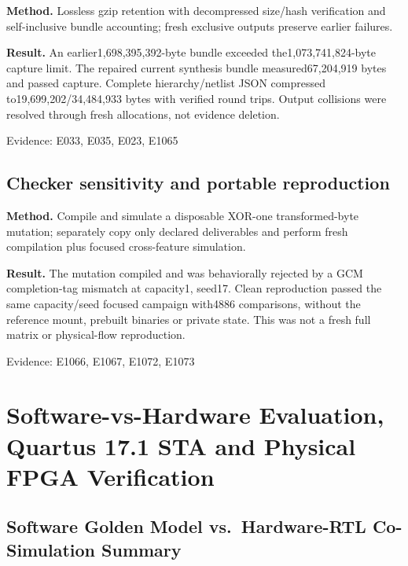 \documentclass[11pt,a4paper]{article}
\begin{document}
\textbf{Method.} Lossless gzip retention with decompressed size/\allowbreak{}hash verification and self-inclusive bundle accounting; fresh exclusive outputs preserve earlier failures.

\textbf{Result.} An earlier1,\allowbreak{}698,\allowbreak{}395,\allowbreak{}392-byte bundle exceeded the1,\allowbreak{}073,\allowbreak{}741,\allowbreak{}824-byte capture limit. The repaired current synthesis bundle measured67,\allowbreak{}204,\allowbreak{}919 bytes and passed capture. Complete hierarchy/\allowbreak{}netlist JSON compressed to19,\allowbreak{}699,\allowbreak{}202/\allowbreak{}34,\allowbreak{}484,\allowbreak{}933 bytes with verified round trips. Output collisions were resolved through fresh allocations,\allowbreak{} not evidence deletion.

{\small Evidence: E033,\allowbreak{} E035,\allowbreak{} E023,\allowbreak{} E1065}

\subsection{Checker sensitivity and portable reproduction}

\textbf{Method.} Compile and simulate a disposable XOR-one transformed-byte mutation; separately copy only declared deliverables and perform fresh compilation plus focused cross-feature simulation.

\textbf{Result.} The mutation compiled and was behaviorally rejected by a GCM completion-tag mismatch at capacity1,\allowbreak{} seed17. Clean reproduction passed the same capacity/\allowbreak{}seed focused campaign with4886 comparisons,\allowbreak{} without the reference mount,\allowbreak{} prebuilt binaries or private state. This was not a fresh full matrix or physical-flow reproduction.

{\small Evidence: E1066,\allowbreak{} E1067,\allowbreak{} E1072,\allowbreak{} E1073}

\section{Software-vs-Hardware Evaluation, Quartus 17.1 STA and Physical FPGA Verification}

\subsection{Software Golden Model vs.\ Hardware-RTL Co-Simulation Summary}
\end{document}
